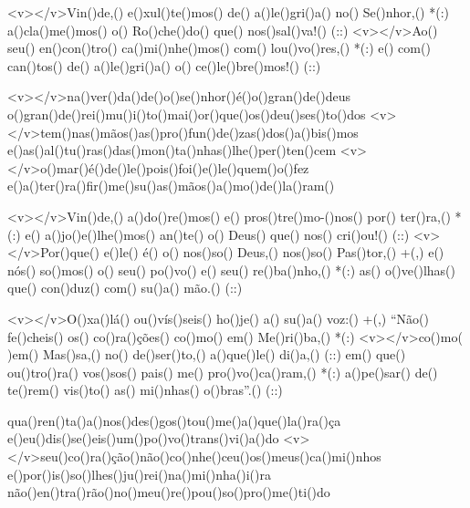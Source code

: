 <v></v>Vin()de,() e()xul()te()mos() de() a()le()gri()a() no() Se()nhor,() *(:)
a()cla()me()mos() o() Ro()che()do() que() nos()sal()va!() (::)
<v></v>Ao() seu() en()con()tro() ca()mi()nhe()mos() com() lou()vo()res,() *(:)
e() com() can()tos() de() a()le()gri()a() o() ce()le()bre()mos!() (::)

<v></v>na()ver()da()de()o()se()nhor()é()o()gran()de()deus
o()gran()de()rei()mu()i()to()mai()or()que()os()deu()ses()to()dos
<v></v>tem()nas()mãos()as()pro()fun()de()zas()dos()a()bis()mos
e()as()al()tu()ras()das()mon()ta()nhas()lhe()per()ten()cem
<v></v>o()mar()é()de()le()pois()foi()e()le()quem()o()fez
e()a()ter()ra()fir()me()su()as()mãos()a()mo()de()la()ram()

<v></v>Vin()de,() a()do()re()mos() e() pros()tre()mo-()nos() por() ter()ra,() *(:)
e() a()jo()e()lhe()mos() an()te() o() Deus() que() nos() cri()ou!() (::)
<v></v>Por()que() e()le() é() o() nos()so() Deus,() nos()so() Pas()tor,() +(,)
e() nós() so()mos() o() seu() po()vo() e() seu() re()ba()nho,() *(:)
as() o()ve()lhas() que() con()duz() com() su()a() mão.() (::)

<v></v>O()xa()lá() ou()vís()seis() ho()je() a() su()a() voz:() +(,)
``Não() fe()cheis() os() co()ra()ções() co()mo() em() Me()ri()ba,() *(:)
<v></v>co()mo( )em() Mas()sa,() no() de()ser()to,() a()que()le() di()a,() (::)
em() que() ou()tro()ra() vos()sos() pais() me() pro()vo()ca()ram,() *(:)
a()pe()sar() de() te()rem() vis()to() as() mi()nhas() o()bras''.() (::)

qua()ren()ta()a()nos()des()gos()tou()me()a()que()la()ra()ça
e()eu()dis()se()eis()um()po()vo()trans()vi()a()do
<v></v>seu()co()ra()ção()não()co()nhe()ceu()os()meus()ca()mi()nhos
e()por()is()so()lhes()ju()rei()na()mi()nha()i()ra
não()en()tra()rão()no()meu()re()pou()so()pro()me()ti()do